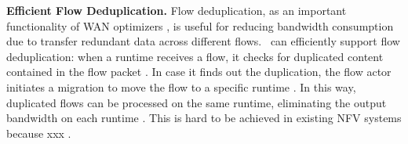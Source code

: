 \noindent\textbf{Efficient Flow Deduplication.} Flow deduplication, as an important functionality of WAN optimizers , is useful for reducing bandwidth consumption due to transfer redundant data across different flows. \nfactor~can efficiently support flow deduplication: when a runtime receives a flow, it checks for duplicated content contained in the flow packet . In case it finds out the duplication, the flow actor initiates a migration to move the flow to a specific runtime . In this way, duplicated flows can be processed on the same runtime, eliminating the output bandwidth on each runtime . This is hard to be achieved in existing NFV systems because xxx .

